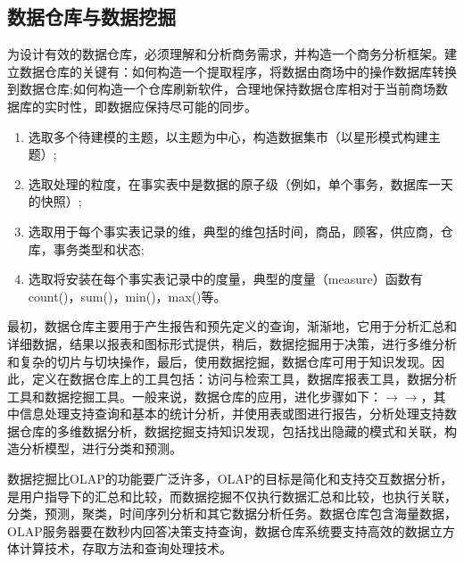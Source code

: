\subsection{数据仓库与数据挖掘}
\par 为设计有效的数据仓库，必须理解和分析商务需求，并构造一个商务分析框架。建立数据仓库的关键有：如何构造一个提取程序，将数据由商场中的操作数据库转换到数据仓库;如何构造一个仓库刷新软件，合理地保持数据仓库相对于当前商场数据库的实时性，即数据应保持尽可能的同步。
\begin{enumerate}[(1)]
\item 选取多个待建模的主题，以主题为中心，构造数据集市（以星形模式构建主题）;
\item 选取处理的粒度，在事实表中是数据的原子级（例如，单个事务，数据库一天的快照）;
\item 选取用于每个事实表记录的维，典型的维包括时间，商品，顾客，供应商，仓库，事务类型和状态;
\item 选取将安装在每个事实表记录中的度量，典型的度量（measure）函数有count()，sum()，min()，max()等。
\end{enumerate}
\par 最初，数据仓库主要用于产生报告和预先定义的查询，渐渐地，它用于分析汇总和详细数据，结果以报表和图标形式提供，稍后，数据挖掘用于决策，进行多维分析和复杂的切片与切块操作，最后，使用数据挖掘，数据仓库可用于知识发现。因此，定义在数据仓库上的工具包括：访问与检索工具，数据库报表工具，数据分析工具和数据挖掘工具。一般来说，数据仓库的应用，进化步骤如下：$\longrightarrow$$\longrightarrow$，其中信息处理支持查询和基本的统计分析，并使用表或图进行报告，分析处理支持数据仓库的多维数据分析，数据挖掘支持知识发现，包括找出隐藏的模式和关联，构造分析模型，进行分类和预测。
\par 数据挖掘比OLAP的功能要广泛许多，OLAP的目标是简化和支持交互数据分析，是用户指导下的汇总和比较，而数据挖掘不仅执行数据汇总和比较，也执行关联，分类，预测，聚类，时间序列分析和其它数据分析任务。数据仓库包含海量数据，OLAP服务器要在数秒内回答决策支持查询，数据仓库系统要支持高效的数据立方体计算技术，存取方法和查询处理技术。
